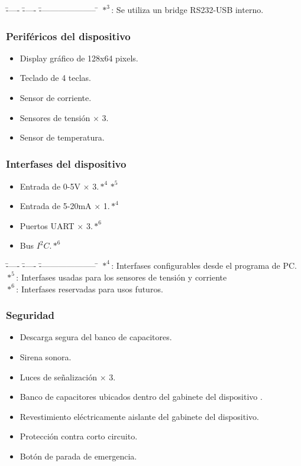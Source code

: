       \begin{tabbing}
	\= ----- \= ----- \= --------------------- \= \kill
	\>$*^{3}$: \>Se utiliza un bridge RS232-USB interno. \\
       \end{tabbing}
	
    \subsubsection{Periféricos del dispositivo}
      \begin{itemize}
	\item Display gráfico de 128x64 pixels.
	\item Teclado de 4 teclas.
	\item Sensor de corriente.
	\item Sensores de tensión $\times$ 3.
	\item Sensor de temperatura.
      \end{itemize}

    \subsubsection{Interfases del dispositivo}
      \begin{itemize}
	\item Entrada de 0-5V $\times$ 3.$*^{4}*^{5}$
	\item Entrada de 5-20mA $\times$ 1.$*^{4}$
	\item Puertos UART $\times$ 3.$*^{6}$
	\item Bus $ I^{2}C $.$*^{6}$
      \end{itemize}

      \begin{tabbing}
       \= ----- \= ----- \= --------------------- \= \kill
	\> $*^{4}$: \>Interfases configurables desde el programa de PC. \\
	\> $*^{5}$: \>Interfases usadas para los sensores de tensión y corriente \\
	\> $*^{6}$: \>Interfases reservadas para usos futuros. \\
      \end{tabbing}

    \subsubsection{Seguridad}
      \begin{itemize}
	\item Descarga segura del banco de capacitores.
	\item Sirena sonora.
	\item Luces de señalización $\times$ 3.
	\item Banco de capacitores ubicados dentro del gabinete del dispositivo .
	\item Revestimiento eléctricamente aislante del gabinete del dispositivo.
	\item Protección contra corto circuito.
	\item Botón de parada de emergencia.
      \end{itemize}

